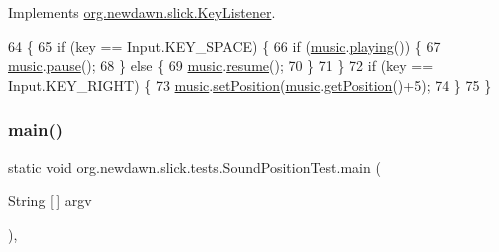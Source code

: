 Implements \mbox{\hyperlink{interfaceorg_1_1newdawn_1_1slick_1_1_key_listener_ac0b0568a21ef486c4f51382614c196ef}{org.\+newdawn.\+slick.\+Key\+Listener}}.


\begin{DoxyCode}
64                                             \{
65         \textcolor{keywordflow}{if} (key == Input.KEY\_SPACE) \{
66             \textcolor{keywordflow}{if} (\mbox{\hyperlink{classorg_1_1newdawn_1_1slick_1_1tests_1_1_sound_position_test_a58ef86e1bdbe61ff8fc326581f3c163c}{music}}.\mbox{\hyperlink{classorg_1_1newdawn_1_1slick_1_1_music_aa81bfb24e3203b254c58425195ab17b7}{playing}}()) \{
67                 \mbox{\hyperlink{classorg_1_1newdawn_1_1slick_1_1tests_1_1_sound_position_test_a58ef86e1bdbe61ff8fc326581f3c163c}{music}}.\mbox{\hyperlink{classorg_1_1newdawn_1_1slick_1_1_music_a1161bc6fe6a0ba7ab6284758b0a8306d}{pause}}();
68             \} \textcolor{keywordflow}{else} \{
69                 \mbox{\hyperlink{classorg_1_1newdawn_1_1slick_1_1tests_1_1_sound_position_test_a58ef86e1bdbe61ff8fc326581f3c163c}{music}}.\mbox{\hyperlink{classorg_1_1newdawn_1_1slick_1_1_music_ac5a48d3b0d207d3740220190f4384033}{resume}}();
70             \}
71         \}
72         \textcolor{keywordflow}{if} (key == Input.KEY\_RIGHT) \{
73             \mbox{\hyperlink{classorg_1_1newdawn_1_1slick_1_1tests_1_1_sound_position_test_a58ef86e1bdbe61ff8fc326581f3c163c}{music}}.\mbox{\hyperlink{classorg_1_1newdawn_1_1slick_1_1_music_add55814269790879af02e9ce4309f26d}{setPosition}}(\mbox{\hyperlink{classorg_1_1newdawn_1_1slick_1_1tests_1_1_sound_position_test_a58ef86e1bdbe61ff8fc326581f3c163c}{music}}.\mbox{\hyperlink{classorg_1_1newdawn_1_1slick_1_1_music_ae565f77bca4ad79f367d6abd90488b26}{getPosition}}()+5);
74         \}
75     \}
\end{DoxyCode}
\mbox{\label{classorg_1_1newdawn_1_1slick_1_1tests_1_1_sound_position_test_ae0ec89dcb26b73d7a3dae0b347d82c51}} 
\subsubsection{\texorpdfstring{main()}{main()}}
{\footnotesize\ttfamily static void org.\+newdawn.\+slick.\+tests.\+Sound\+Position\+Test.\+main (\begin{DoxyParamCaption}\item[{String \mbox{[}$\,$\mbox{]}}]{argv }\end{DoxyParamCaption})\hspace{0.3cm}{\ttfamily [inline]}, {\ttfamily [static]}}

